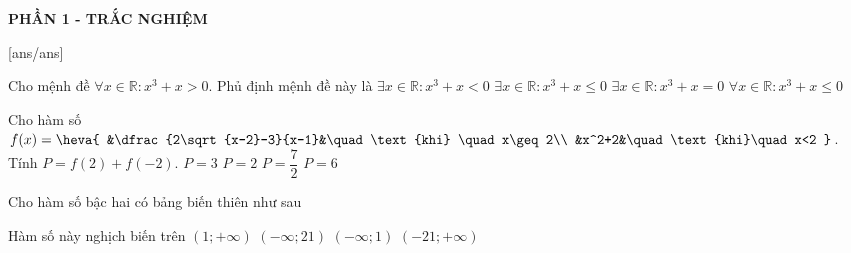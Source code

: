 
\begin{center}
	\textbf{PHẦN 1 - TRẮC NGHIỆM}
\end{center}
[ans/ans]
\begin{ex}%
	Cho mệnh đề $\forall x\in \mathbb{R}\colon x^3+x>0$. Phủ định mệnh đề này là
	\choice
	{$\exists x\in \mathbb{R}\colon x^3+x<0$}
	{\True $\exists x\in \mathbb{R}\colon x^3+x\leq 0$}
	{$\exists x\in \mathbb{R}\colon x^3+x=0$}
	{$\forall x\in \mathbb{R}\colon x^3+x\leq 0$}
\end{ex}

\begin{ex}%
	Cho hàm số $f(x)=\heva{
	&\dfrac{2\sqrt{x-2}-3}{x-1}&\quad\text{khi} \quad x\geq 2\\
	&x^2+2&\quad\text{khi}\quad x<2
	}$. Tính $P=f(2)+f(-2)$.
	\choice
	{\True $P=3$}
	{$P=2$}
	{$P=\dfrac{7}{2}$}
	{$P=6$}
\end{ex}

\begin{ex}%
	Cho hàm số bậc hai có bảng biến thiên như sau
	\begin{center}
\end{center}
Hàm số này nghịch biến trên
	\choice
	{\True $(1;+\infty)$}
	{$(-\infty;21)$}
	{$(-\infty;1)$}
	{$(-21;+\infty)$}
\end{ex}


